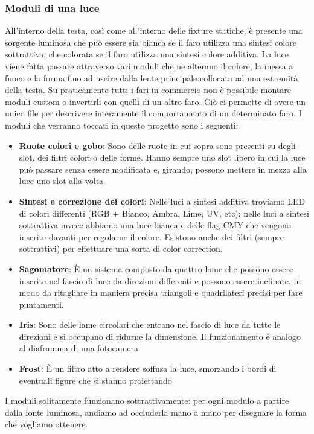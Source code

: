 \documentclass[main.tex]{subfiles}
\begin{document}
\subsubsection{Moduli di una luce}\label{subsec:1_1_modules}
All'interno della testa, così come all'interno delle fixture statiche, è presente una sorgente luminosa che può essere sia bianca se il faro utilizza una sintesi colore sottrattiva, che colorata se il faro utilizza una sintesi colore additiva. La luce viene fatta passare attraverso vari moduli che ne alterano il colore, la messa a fuoco e la forma fino ad uscire dalla lente principale collocata ad una estremità della testa. Su praticamente tutti i fari in commercio non è possibile montare moduli custom o invertirli con quelli di un altro faro. Ciò ci permette di avere un unico file per descrivere interamente il comportamento di un determinato faro. \newline
I moduli che verranno toccati in questo progetto sono i seguenti:
\begin{itemize}
    \item \textbf{Ruote colori e gobo}: Sono delle ruote in cui sopra sono presenti su degli slot, dei filtri colori o delle forme. Hanno sempre uno slot libero in cui la luce può passare senza essere modificata e, girando, possono mettere in mezzo alla luce uno slot alla volta
    \item \textbf{Sintesi e correzione dei colori}: Nelle luci a sintesi additiva troviamo LED di colori differenti (RGB + Bianco, Ambra, Lime, UV, etc); nelle luci a sintesi sottrattiva invece abbiamo una luce bianca e delle flag CMY che vengono inserite davanti per regolarne il colore. Esistono anche dei filtri (sempre sottrattivi) per effettuare una sorta di color correction.
    \item \textbf{Sagomatore}: È un sistema composto da quattro lame che possono essere inserite nel fascio di luce da direzioni differenti e possono essere inclinate, in modo da ritagliare in maniera precisa triangoli e quadrilateri precisi per fare puntamenti.
    \item \textbf{Iris}: Sono delle lame circolari che entrano nel fascio di luce da tutte le direzioni e si occupano di ridurne la dimensione. Il funzionamento è analogo al diaframma di una fotocamera
    \item \textbf{Frost}: È un filtro atto a rendere soffusa la luce, smorzando i bordi di eventuali figure che si stanno proiettando
\end{itemize}
I moduli solitamente funzionano sottrattivamente: per ogni modulo a partire dalla fonte luminosa, andiamo ad occluderla mano a mano per disegnare la forma che vogliamo ottenere.
\end{document}
